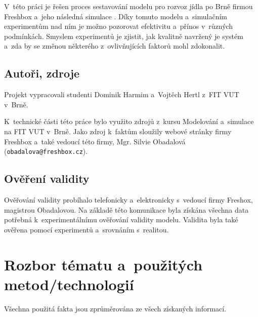 \documentclass[a4paper, 11pt]{article}
\begin{document}
	V~této práci je řešen proces sestavování modelu \cite[snímek 7]{IMS_slides}
	pro rozvoz jídla po Brně firmou Freshbox \cite{Freshbox} a~jeho následná
	simulace \cite[snímek 33]{IMS_slides}. Díky tomuto modelu a~simulačním
	experimentům \cite[snímek 9]{Freshbox} nad ním je možno pozorovat
	efektivitu a~přínos v~různých podmínkách. Smyslem experimentů je zjistit,
	jak kvalitně navržený je systém \cite[snímek 18]{IMS_slides} a~zda by se
	změnou některého z~ovlivňujících faktorů mohl zdokonalit.


	\subsection{Autoři, zdroje}

	Projekt vypracovali studenti Dominik Harmim a~Vojtěch Hertl z~FIT VUT
	v~Brně.

	K~technické části této práce bylo využito zdrojů z~kursu Modelování
	a~simulace na FIT VUT v~Brně. Jako zdroj k~faktům sloužily webové stránky
	firmy Freshbox a~také vedoucí této firmy, Mgr. Silvie Obadalová\\
	(\texttt{obadalova@freshbox.cz}).


	\subsection{Ověření validity}

	Ověřování validity \cite[snímek 37]{Freshbox} probíhalo telefonicky
	a~elektronicky s~vedoucí firmy Freshox, magistrou Obadalovou. Na základě
	této komunikace byla získána všechna data potřebná k~experimentálnímu
	ověřování validity modelu. Validita byla také ověřena pomocí experimentů
	a~srovnáním s~realitou.



	\section{Rozbor tématu a~použitých metod/technologií}

	Všechna použitá fakta jsou zprůměrována ze všech získaných informací. \\
\end{document}

